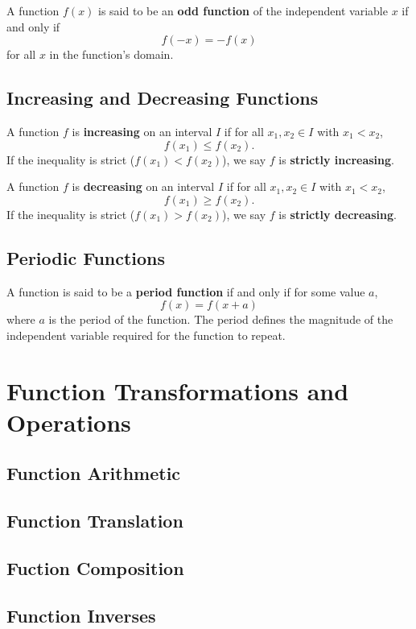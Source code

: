         \begin{definition}
            A function $f(x)$ is said to be an \textbf{odd function} of the independent variable $x$ if and only if
            $$
            f(-x) = -f(x)
            $$
            for all $x$ in the function's domain.
        \end{definition}

        \subsection{Increasing and Decreasing Functions}
        \begin{definition}
            A function $f$ is \textbf{increasing} on an interval $I$ if for all $x_1, x_2 \in I$ with $x_1 < x_2$,
            $$
            f(x_1) \leq f(x_2).
            $$
            If the inequality is strict ($f(x_1) < f(x_2)$), we say $f$ is \textbf{strictly increasing}.
        \end{definition}

        \begin{definition}
            A function $f$ is \textbf{decreasing} on an interval $I$ if for all $x_1, x_2 \in I$ with $x_1 < x_2$,
            $$
            f(x_1) \geq f(x_2).
            $$
            If the inequality is strict ($f(x_1) > f(x_2)$), we say $f$ is \textbf{strictly decreasing}.
        \end{definition}

        \subsection{Periodic Functions}
        \label{sect:periodicfunctions}
        \begin{definition}
            A function is said to be a \textbf{period function} if and only if for some value $a$,
            $$
            f(x) = f(x+a)
            $$
            where $a$ is the period of the function. The period defines the magnitude of the independent variable required for the function to repeat.
        \end{definition}

        \section{Function Transformations and Operations}
        \subsection{Function Arithmetic}
        \subsection{Function Translation}
        \subsection{Fuction Composition}
        \subsection{Function Inverses}
        \label{sect:function inverses}
